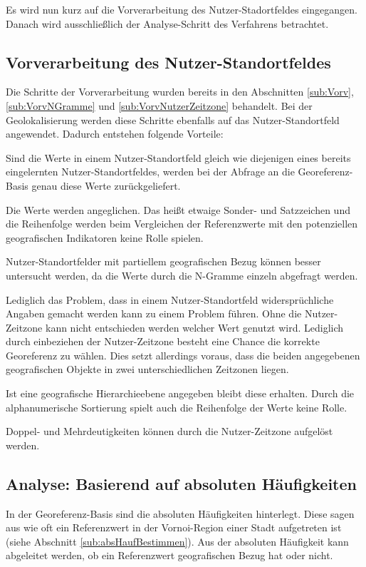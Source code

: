 		Es wird nun kurz auf die Vorverarbeitung des Nutzer-Stadortfeldes eingegangen.
		Danach wird ausschließlich der Analyse-Schritt des Verfahrens betrachtet.

		\subsection{Vorverarbeitung des Nutzer-Standortfeldes}

			Die Schritte der Vorverarbeitung wurden bereits in den Abschnitten \ref{sub:Vorv}, \ref{sub:VorvNGramme} und \ref{sub:VorvNutzerZeitzone} behandelt. 
			Bei der Geolokalisierung werden diese Schritte ebenfalls auf das Nutzer-Standortfeld angewendet.
			Dadurch entstehen folgende Vorteile:

			Sind die Werte in einem Nutzer-Standortfeld gleich wie diejenigen eines bereits eingelernten Nutzer-Standortfeldes, werden bei der Abfrage an die Georeferenz-Basis genau diese Werte zurückgeliefert.

			Die Werte werden angeglichen. 
			Das heißt etwaige Sonder- und Satzzeichen und die Reihenfolge werden beim Vergleichen der Referenzwerte mit den potenziellen geografischen Indikatoren keine Rolle spielen.
			
			Nutzer-Standortfelder mit partiellem geografischen Bezug können besser untersucht werden, da die Werte durch die N-Gramme einzeln abgefragt werden.

			Lediglich das Problem, dass in einem Nutzer-Standortfeld widersprüchliche Angaben gemacht werden kann zu einem Problem führen. 
			Ohne die Nutzer-Zeitzone kann nicht entschieden werden welcher Wert genutzt wird.
			Lediglich durch einbeziehen der Nutzer-Zeitzone besteht eine Chance die korrekte Georeferenz zu wählen.
			Dies setzt allerdings voraus, dass die beiden angegebenen geografischen Objekte in zwei unterschiedlichen Zeitzonen liegen.

			Ist eine geografische Hierarchieebene angegeben bleibt diese erhalten.
			Durch die alphanumerische Sortierung spielt auch die Reihenfolge der Werte keine Rolle.

			Doppel- und Mehrdeutigkeiten können durch die Nutzer-Zeitzone aufgelöst werden. 
			
		\subsection{Analyse: Basierend auf absoluten Häufigkeiten} 

			In der Georeferenz-Basis sind die absoluten Häufigkeiten hinterlegt.
			Diese sagen aus wie oft ein Referenzwert in der Vornoi-Region einer Stadt aufgetreten ist (siehe Abschnitt \ref{sub:absHaufBestimmen}). 
			Aus der absoluten Häufigkeit kann abgeleitet werden, ob ein Referenzwert geografischen Bezug hat oder nicht.


